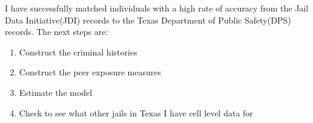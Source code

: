 \documentclass[12pt, a4paper]{article}
\begin{document}
I have successfully matched individuals with a high rate of accuracy from the Jail Data Initiative(JDI) records to the Texas Department of Public Safety(DPS) records. The next steps are:
\begin{enumerate}
    \item Construct the criminal histories
    \item Construct the peer exposure measures
    \item Estimate the model 
    \item Check to see what other jails in Texas I have cell level data for
\end{enumerate}


\newpage

\end{document}

